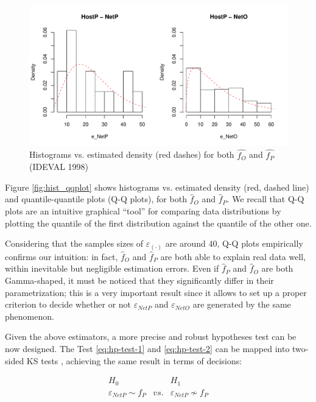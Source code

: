 \begin{figure}[t]
  \centering
  \includegraphics[width=\textwidth]{figures/correlation/causality/hist_1998}
  \caption{Histograms vs. estimated density (red dashes) for
    both $\hat{f_{O}}$ and $\hat{f_{P}}$ (\ac{IDEVAL} 1998)}
  \label{fig:hist_1998}
\end{figure}

Figure \ref{fig:hist_qqplot} shows histograms vs. estimated density (red, dashed line) and quantile-quantile plots (Q-Q plots), for both $\hat{f}_{O}$ and $\hat{f}_{P}$. We recall that Q-Q plots are an intuitive graphical ``tool'' for comparing data distributions by plotting the quantile of the first distribution against the quantile of the other one.

Considering that the samples sizes of $\varepsilon_{(\cdot)}$ are around 40, Q-Q plots empirically confirms our intuition: in fact, $\hat{f}_{O}$ and $\hat{f}_{P}$ are both able to explain real data well, within inevitable but negligible estimation errors. Even if $\hat{f}_{P}$ and $\hat{f}_{O}$ are both Gamma-shaped, it must be noticed that they significantly differ in their parametrization; this is a very important result since it allows to set up a proper criterion to decide whether or not $\varepsilon_{NetP}$ and $\varepsilon_{NetO}$ are generated by the same phenomenon.

Given the above estimators, a more precise and robust hypotheses test can be now designed. The Test \ref{eq:hp-test-1} and \ref{eq:hp-test-2} can be mapped into two-sided \ac{KS} tests \citep{pestman}, achieving the same result in terms of decisions:

\begin{equation}\label{eq:ks-test-1}
  \begin{array}{ccc}
    H_{0} && H_{1}\\
    \varepsilon_{NetP} \sim f_{P} &vs.& \varepsilon_{NetP} \not\sim f_{P}
  \end{array}
\end{equation}

